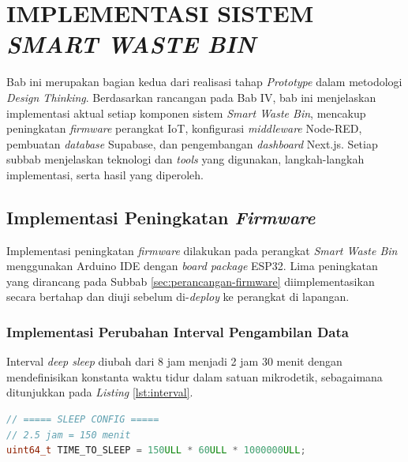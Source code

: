 \cleardoublepage
\chapter{IMPLEMENTASI SISTEM \textit{SMART WASTE BIN}}
\label{chap:implementasi}

Bab ini merupakan bagian kedua dari realisasi tahap \textit{Prototype} dalam metodologi \textit{Design Thinking}. Berdasarkan rancangan pada Bab IV, bab ini menjelaskan implementasi aktual setiap komponen sistem \textit{Smart Waste Bin}, mencakup peningkatan \textit{firmware} perangkat IoT, konfigurasi \textit{middleware} Node-RED, pembuatan \textit{database} Supabase, dan pengembangan \textit{dashboard} Next.js. Setiap subbab menjelaskan teknologi dan \textit{tools} yang digunakan, langkah-langkah implementasi, serta hasil yang diperoleh.

\section{Implementasi Peningkatan \textit{Firmware}}
\label{sec:impl-firmware}

Implementasi peningkatan \textit{firmware} dilakukan pada perangkat \textit{Smart Waste Bin} menggunakan Arduino IDE dengan \textit{board package} ESP32. Lima peningkatan yang dirancang pada Subbab \ref{sec:perancangan-firmware} diimplementasikan secara bertahap dan diuji sebelum di-\textit{deploy} ke perangkat di lapangan.

\subsection{Implementasi Perubahan Interval Pengambilan Data}

Interval \textit{deep sleep} diubah dari 8 jam menjadi 2 jam 30 menit dengan mendefinisikan konstanta waktu tidur dalam satuan mikrodetik, sebagaimana ditunjukkan pada \textit{Listing} \ref{lst:interval}.

\begin{lstlisting}[caption={Implementasi Perubahan Interval Pengambilan Data}, label={lst:interval}, language=C++]
// ===== SLEEP CONFIG =====
// 2.5 jam = 150 menit
uint64_t TIME_TO_SLEEP = 150ULL * 60ULL * 1000000ULL;
\end{lstlisting}

